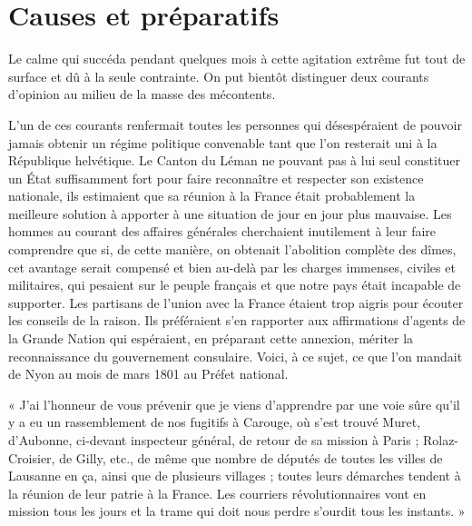 \documentclass[french,twoside]{book} %
\newenvironment{quoteblock}%
  {\begin{quoting}}
  {\end{quoting}}
\newenvironment{quotebar}{%
    \def\FrameCommand{{\color{rubric!10!}\vrule width 0.5em} \hspace{0.9em}}%
    \def\OuterFrameSep{\itemsep} %
    \MakeFramed {\advance\hsize-\width \FrameRestore}
  }%
  {%
    \endMakeFramed
  }
\renewenvironment{quoteblock}%
  {%
    \savenotes
    \setstretch{0.9}
    \begin{quotebar}
  }
  {%
    \end{quotebar}
    \spewnotes
  }
\begin{document}
\section[Causes et préparatifs]{Causes et préparatifs}
\noindent Le calme qui succéda pendant quelques mois à cette agitation extrême fut tout de surface et dû à la seule contrainte. On put bientôt distinguer deux courants d’opinion au milieu de la masse des mécontents.\par
L’un de ces courants renfermait toutes les personnes qui désespéraient de pouvoir jamais obtenir un régime politique convenable tant que l’on resterait uni à la République helvétique. Le Canton du Léman ne pouvant pas à lui seul constituer un État suffisamment fort pour faire reconnaître et respecter son existence nationale, ils estimaient que sa réunion à la France était probablement la meilleure solution à apporter à une situation de jour en jour plus mauvaise. Les hommes au courant des affaires générales cherchaient inutilement à leur faire comprendre que si, de cette manière, on obtenait l’abolition complète des dîmes, cet avantage serait compensé et bien au-delà par les charges immenses, civiles et militaires, qui pesaient sur le peuple français et que notre pays était incapable de supporter. Les partisans de l’union avec la France étaient trop aigris pour écouter les conseils de la raison. Ils préféraient s’en rapporter aux affirmations d’agents de la Grande Nation qui espéraient, en préparant cette annexion, mériter la reconnaissance du gouvernement consulaire. Voici, à ce sujet, ce que l’on mandait de Nyon au mois de mars 1801 au Préfet national.\par

\begin{quoteblock}
\noindent « J’ai l’honneur de vous prévenir que je viens d’apprendre par une voie sûre qu’il y a eu un rassemblement de nos fugitifs à Carouge, où s’est trouvé Muret, d’Aubonne, ci-devant inspecteur général, de retour de sa mission à Paris ; Rolaz-Croisier, de Gilly, etc., de même que nombre de députés de toutes les villes de Lausanne en ça, ainsi que de plusieurs villages ; toutes leurs démarches tendent à la réunion de leur patrie à la France. Les courriers révolutionnaires vont en mission tous les jours et la trame qui doit nous perdre s’ourdit tous les instants. »\end{quoteblock}
\end{document}
